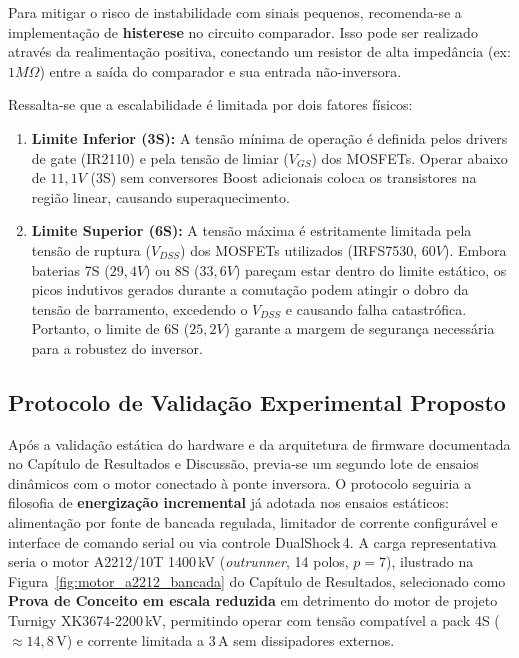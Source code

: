 Para mitigar o risco de instabilidade com sinais pequenos, recomenda-se a implementação de \textbf{histerese} no circuito comparador. Isso pode ser realizado através da realimentação positiva, conectando um resistor de alta impedância (ex: $1M\Omega$) entre a saída do comparador e sua entrada não-inversora.

Ressalta-se que a escalabilidade é limitada por dois fatores físicos:
\begin{enumerate}
    \item \textbf{Limite Inferior (3S):} A tensão mínima de operação é definida pelos drivers de gate (IR2110) e pela tensão de limiar ($V_{GS}$) dos MOSFETs. Operar abaixo de $11,1V$ (3S) sem conversores Boost adicionais coloca os transistores na região linear, causando superaquecimento.
    \item \textbf{Limite Superior (6S):} A tensão máxima é estritamente limitada pela tensão de ruptura ($V_{DSS}$) dos MOSFETs utilizados (IRFS7530, $60V$). Embora baterias 7S ($29,4V$) ou 8S ($33,6V$) pareçam estar dentro do limite estático, os picos indutivos gerados durante a comutação podem atingir o dobro da tensão de barramento, excedendo o $V_{DSS}$ e causando falha catastrófica. Portanto, o limite de 6S ($25,2V$) garante a margem de segurança necessária para a robustez do inversor.
\end{enumerate}

\subsection{Protocolo de Validação Experimental Proposto}
\label{subsec:protocolo_validacao_proposto}

Após a validação estática do hardware e da arquitetura de firmware documentada no Capítulo de Resultados e Discussão, previa-se um segundo lote de ensaios dinâmicos com o motor conectado à ponte inversora. O protocolo seguiria a filosofia de \textbf{energização incremental} já adotada nos ensaios estáticos: alimentação por fonte de bancada regulada, limitador de corrente configurável e interface de comando serial ou via controle DualShock\,4. A carga representativa seria o motor A2212/10T 1400\,kV (\textit{outrunner}, 14 polos, $p = 7$), ilustrado na Figura~\ref{fig:motor_a2212_bancada} do Capítulo de Resultados, selecionado como \textbf{Prova de Conceito em escala reduzida} em detrimento do motor de projeto Turnigy XK3674-2200\,kV, permitindo operar com tensão compatível a pack 4S ($\approx 14{,}8\,\text{V}$) e corrente limitada a $3\,\text{A}$ sem dissipadores externos.

